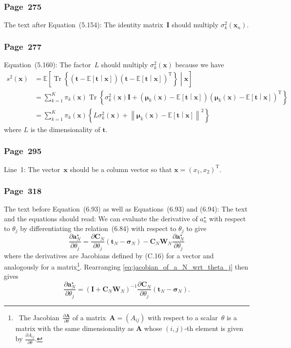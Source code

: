 \documentclass[12pt,a4paper]{article}
\newcommand{\erratum}[1]{\subsubsection*{#1}}
\begin{document}
\erratum{Page~275}
The text after Equation~(5.154):
The identity matrix~$\mathbf{I}$ should multiply $\sigma_{k}^{2}(\mathbf{x}_{n})$.

\erratum{Page~277}
Equation~(5.160):
The factor~$L$ should multiply $\sigma_{k}^{2}(\mathbf{x})$ because we have
\begin{align}
s^2(\mathbf{x}) &=
  \mathbb{E}\left[
    \operatorname{Tr}\left\{
      \left( \mathbf{t} - \mathbb{E}\left[ \mathbf{t} \middle| \mathbf{x} \right] \right)
      \left( \mathbf{t} - \mathbb{E}\left[ \mathbf{t} \middle| \mathbf{x} \right]
        \right)^{\operatorname{T}} \right\}
  \middle| \mathbf{x} \right] \\
&= \sum_{k=1}^{K} \pi_{k}(\mathbf{x})
  \operatorname{Tr}\left\{ \sigma_{k}^{2}(\mathbf{x})\mathbf{I} +
    \left( \bm{\mu}_{k}(\mathbf{x}) -
      \mathbb{E}\left[ \mathbf{t} \middle| \mathbf{x} \right] \right)
    \left( \bm{\mu}_{k}(\mathbf{x}) -
      \mathbb{E}\left[ \mathbf{t} \middle| \mathbf{x} \right] \right)^{\operatorname{T}}
  \right\} \\
&= \sum_{k=1}^{K} \pi_{k}(\mathbf{x})
  \left\{ L \sigma_{k}^{2}(\mathbf{x}) +
    \left\| \bm{\mu}_{k}(\mathbf{x}) -
      \mathbb{E}\left[ \mathbf{t} \middle| \mathbf{x} \right] \right\|^{2}
  \right\}
\end{align}
where $L$ is the dimensionality of $\mathbf{t}$.

\erratum{Page~295}
Line~1:
The vector~$\mathbf{x}$ should be a column vector so that
$\mathbf{x} = \left( x_1, x_2 \right)^{\operatorname{T}}$.

\erratum{Page~318}
The text before Equation~(6.93) as well as Equations~(6.93) and (6.94):
The text and the equations should read:
We can evaluate the derivative of $a_n^{\star}$ with respect to $\theta_j$ by differentiating
the relation~(6.84) with respect to $\theta_j$ to give
\begin{equation}
\frac{\partial \mathbf{a}_N^{\star}}{\partial \theta_j}
 = \frac{\partial\mathbf{C}_N}{\partial \theta_j} \left( \mathbf{t}_N - \bm{\sigma}_N \right)
   - \mathbf{C}_N \mathbf{W}_N \frac{\partial \mathbf{a}_N^{\star}}{\partial \theta_j}
   \label{eq:jacobian_of_a_N_wrt_theta_j}
\end{equation}
where the derivatives are Jacobians defined by (C.16) for a vector and
analogously for a matrix\footnote{\
The Jacobian~$\frac{\partial\mathbf{A}}{\partial\theta}$ of
a matrix~$\mathbf{A} = (A_{ij})$ with respect to a scalar~$\theta$ is
a matrix with the same dimensionality as $\mathbf{A}$
whose $(i, j)$-th element is given by $\frac{\partial A_{ij}}{\partial\theta}$.}.
Rearranging \eqref{eq:jacobian_of_a_N_wrt_theta_j} then gives
\begin{equation}
\frac{\partial \mathbf{a}_N^{\star}}{\partial \theta_j}
 = \left( \mathbf{I} + \mathbf{C}_N \mathbf{W}_N \right)^{-1}
   \frac{\partial\mathbf{C}_N}{\partial \theta_j} \left( \mathbf{t}_N - \bm{\sigma}_N \right) .
\end{equation}
\end{document}
